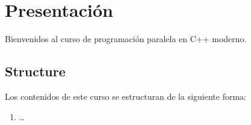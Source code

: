 \chapter*{Presentación}

Bienvenidos al curso de programación paralela en C++ moderno.


\section*{Structure}

Los contenidos de este curso se estructuran de la siguiente forma:

\begin{enumerate}

\item \ldots

\end{enumerate}
